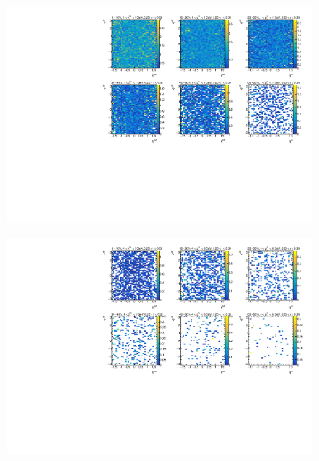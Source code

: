 \begin{figure}
\begin{subfigure}{.5\textwidth}
\caption{}
\end{subfigure} \\
\begin{subfigure}{.5\textwidth}
\centering \includegraphics[width=1\textwidth]{figures/main/UE/eta_phi_map_trk2_dR5}
\caption{}
\end{subfigure}
\begin{subfigure}{.5\textwidth}
\centering \includegraphics[width=1\textwidth]{figures/main/UE/eta_phi_map_trk6_dR5}
\caption{}
\end{subfigure} \\
\begin{subfigure}{.5\textwidth}

\end{subfigure}
\end{figure}
